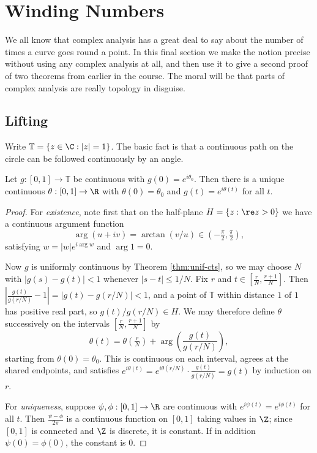 \section{Winding Numbers}

We all know that complex analysis has a great deal to say about the number of times a curve goes round a point. In this final section we make the notion precise without using any complex analysis at all, and then use it to give a second proof of two theorems from earlier in the course. The moral will be that parts of complex analysis are really topology in disguise.

\subsection{Lifting}

Write $\mathbb{T} = \{z\in\C : |z|=1\}$. The basic fact is that a continuous path on the circle can be followed continuously by an angle.

\begin{theorem}\label{thm:lifting}
	Let $g : [0,1]\to\mathbb{T}$ be continuous with $g(0)=e^{i\theta_0}$. Then there is a unique continuous $\theta : [0,1]\to\R$ with $\theta(0)=\theta_0$ and $g(t) = e^{i\theta(t)}$ for all $t$.
\end{theorem}

\begin{proof}
	For \emph{existence}, note first that on the half-plane $H = \{z : \re z>0\}$ we have a continuous argument function
	$$\arg(u+iv) = \arctan(v/u) \in (-\tfrac\pi2,\tfrac\pi2),$$
	satisfying $w = |w|e^{i\arg w}$ and $\arg 1 = 0$.

	Now $g$ is uniformly continuous by Theorem \ref{thm:unif-cts}, so we may choose $N$ with $|g(s)-g(t)|<1$ whenever $|s-t|\leq1/N$. Fix $r$ and $t\in[\tfrac rN,\tfrac{r+1}N]$. Then $\left|\frac{g(t)}{g(r/N)}-1\right| = |g(t)-g(r/N)| < 1$, and a point of $\mathbb T$ within distance $1$ of $1$ has positive real part, so $g(t)/g(r/N)\in H$. We may therefore define $\theta$ successively on the intervals $[\tfrac rN,\tfrac{r+1}N]$ by
	$$\theta(t) = \theta\!\left(\tfrac rN\right) + \arg\left(\frac{g(t)}{g(r/N)}\right),$$
	starting from $\theta(0)=\theta_0$. This is continuous on each interval, agrees at the shared endpoints, and satisfies $e^{i\theta(t)} = e^{i\theta(r/N)}\cdot\frac{g(t)}{g(r/N)} = g(t)$ by induction on $r$.

	For \emph{uniqueness}, suppose $\psi,\phi:[0,1]\to\R$ are continuous with $e^{i\psi(t)}=e^{i\phi(t)}$ for all $t$. Then $\frac{\psi-\phi}{2\pi}$ is a continuous function on $[0,1]$ taking values in $\Z$; since $[0,1]$ is connected and $\Z$ is discrete, it is constant. If in addition $\psi(0)=\phi(0)$, the constant is $0$.
\end{proof}

